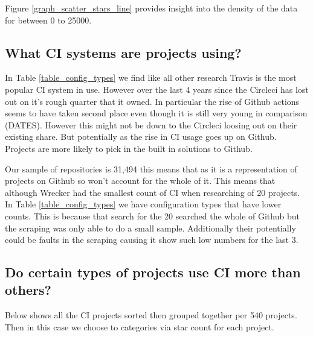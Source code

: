 \documentclass[twoside,12pt,titlepage,a4paper]{article}
\begin{document}
Figure \ref{graph_scatter_stars_line} provides insight into the density of the data for between 0 to 25000.
\vspace*{-0.05in}
\subsection{What CI systems are projects using?}
\vspace*{-0.05in}
In Table \ref{table_config_types} we find like all other research Travis is the most popular CI system in use. However over the last 4 years since the \cite{Github2017} Circleci has lost out on it's rough quarter that it owned. In particular the rise of Github actions seems to have taken second place even though it is still very young in comparison (DATES). However this might not be down to the Circleci loosing out on their existing share. But potentially as the rise in CI usage goes up on Github. Projects are more likely to pick in the built in solutions to Github.


Our sample of repositories is 31,494 this means that as it is a representation of projects on Github so won't account for the whole of it. This means that although Wrecker had the smallest count of CI when researching of 20 projects. In Table \ref{table_config_types} we have configuration types that have lower counts. This is because that search for the 20 searched the whole of Github but the scraping was only able to do a small sample. Additionally their potentially could be faults in the scraping causing it show such low numbers for the last 3.

\pagebreak
\vspace*{-0.05in}
\subsection{Do certain types of projects use CI more than others?}  
\vspace*{-0.05in}

Below shows all the CI projects sorted then grouped together per 540 projects. Then in this case we choose to categories via star count for each project. 
\end{document}
